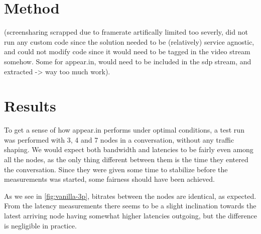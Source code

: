 \section{Method}\label{sec:method}

(screensharing scrapped due to framerate artifically limited too severly, did not run any custom code since the solution needed to be (relatively) service agnostic, and could not modify code since it would need to be tagged in the video stream somehow. Some for appear.in, would need to be included in the sdp stream, and extracted -> way too much work).


\section{Results}

To get a sense of how appear.in performs under optimal conditions, a test run was performed with 3, 4 and 7 nodes in a conversation, without any traffic shaping. We would expect both bandwidth and latencies to be fairly even among all the nodes, as the only thing different between them is the time they entered the conversation. Since they were given some time to stabilize before the measurements was started, some fairness should have been achieved.

As we see in \autoref{fig:vanilla-3p}, bitrates between the nodes are identical, as expected. From the latency measurements there seems to be a slight inclination towards the latest arriving node having somewhat higher latencies outgoing, but the difference is negligible in practice.


